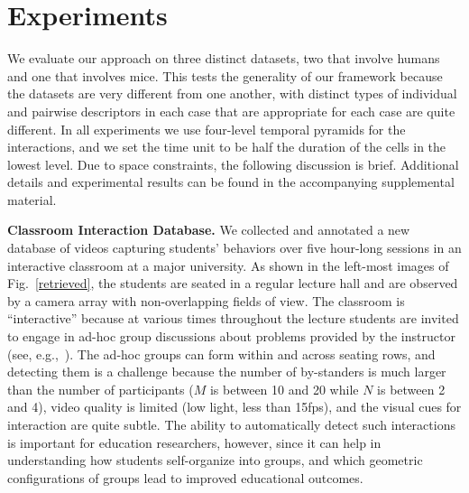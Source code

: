 \section{Experiments}
\label{expall}

We evaluate our approach on three distinct datasets, two that involve humans and one that involves mice. This tests the generality of our framework because the datasets are very different from one another, with distinct types of individual and pairwise descriptors in each case that are appropriate for each case are quite different. In all experiments we use four-level temporal pyramids for the interactions, and we set the time unit to be half the duration of the cells in the lowest level. Due to space constraints, the following discussion is brief. Additional details and experimental results can be found in the accompanying supplemental material.


\vspace{0.05in}\noindent\textbf{Classroom Interaction Database.} We collected and annotated a new database of videos capturing students' behaviors over five hour-long sessions in an interactive classroom at a major university. As shown in the left-most images of Fig.~\ref{retrieved}, the students are seated in a regular lecture hall and are observed by a camera array with non-overlapping fields of view. The classroom is ``interactive'' because at various times throughout the lecture students are invited to engage in ad-hoc group discussions about problems provided by the instructor (see, e.g.,~\cite{Crouch:PI}). The ad-hoc groups can form within and across seating rows, and detecting them is a challenge because the number of by-standers  is much larger than the number of participants ($M$ is between 10 and 20 while $N$ is between 2 and 4), video quality is limited (low light, less than 15fps), and the visual cues for interaction are quite subtle. The ability to automatically detect such interactions is important for education researchers, however, since it can help in understanding how students self-organize into groups, and which geometric configurations of groups lead to improved educational outcomes.

